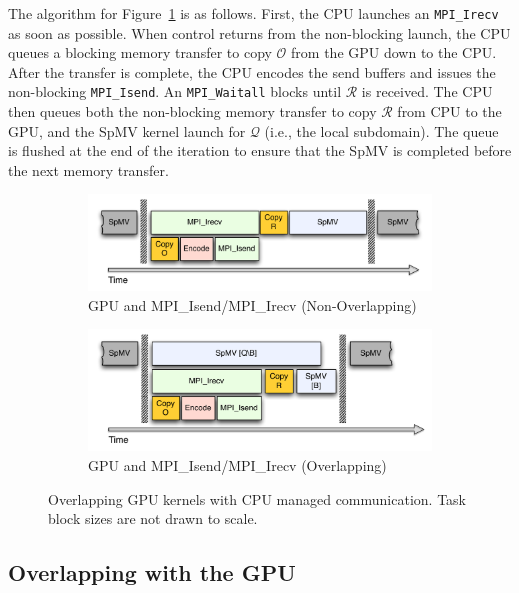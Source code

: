 The algorithm for Figure~\ref{fig:isendirecv_gpu} is as follows. First, the CPU launches an \texttt{MPI\_Irecv} as soon as possible. When control returns from the non-blocking launch, the CPU queues a blocking memory transfer to copy $\mathcal{O}$ from the GPU down to the CPU. After the transfer is complete, the CPU encodes the send buffers and issues the non-blocking \texttt{MPI\_Isend}. An \texttt{MPI\_Waitall} blocks until $\mathcal{R}$ is received. The CPU then queues both the non-blocking memory transfer to copy $\mathcal{R}$ from CPU to the GPU, and the SpMV kernel launch for $\mathcal{Q}$ (i.e., the local subdomain). The queue is flushed at the end of the iteration to ensure that the SpMV is completed before the next memory transfer.

\begin{figure} 
\centering
\begin{subfigure}{0.48\textwidth}
\centering
\includegraphics[width=\textwidth]{../figures/omnigraffle/GPU_IsendIrecv.pdf}
\caption{GPU and MPI\_Isend/MPI\_Irecv (Non-Overlapping)}
\label{fig:isendirecv_gpu}
\end{subfigure}
\quad
\begin{subfigure}{0.48\textwidth}
\centering
\includegraphics[width=\textwidth]{../figures/omnigraffle/GPU_OverlapGPU.pdf}
\caption{GPU and MPI\_Isend/MPI\_Irecv (Overlapping)}
\label{fig:overlap_gpu}
\end{subfigure}
\caption{Overlapping GPU kernels with CPU managed communication. Task block sizes are not drawn to scale.} 
\label{fig:gpu_mpi_tuning}
\end{figure}

\subsection{Overlapping with the GPU}

